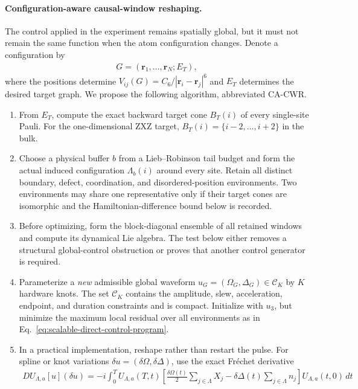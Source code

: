 \paragraph{Configuration-aware causal-window reshaping.}
The control applied in the experiment remains spatially global, but it must
not remain the same function when the atom configuration changes.  Denote a
configuration by
\begin{align}
G=(\boldsymbol r_1,\ldots,\boldsymbol r_N;E_T),
\end{align}
where the positions determine
$V_{ij}(G)=C_6/|\boldsymbol r_i-\boldsymbol r_j|^6$ and $E_T$ determines the
desired target graph.  We propose the following algorithm, abbreviated
CA-CWR.
\begin{enumerate}
\item From $E_T$, compute the exact backward target cone
$B_T(i)$ of every single-site Pauli.  For the one-dimensional ZXZ target,
$B_T(i)=\{i-2,\ldots,i+2\}$ in the bulk.
\item Choose a physical buffer $b$ from a Lieb--Robinson tail budget and form
the actual induced configuration $\Lambda_b(i)$ around every site.  Retain
all distinct boundary, defect, coordination, and disordered-position
environments.  Two environments may share one representative only if their
target cones are isomorphic and the Hamiltonian-difference bound below is
recorded.
\item Before optimizing, form the block-diagonal ensemble of all retained
windows and compute its dynamical Lie algebra.  The test below either removes
a structural global-control obstruction or proves that another control
generator is required.
\item Parameterize a \emph{new} admissible global waveform
$u_G=(\Omega_G,\Delta_G)\in\mathcal C_K$ by $K$ hardware knots.  The set
$\mathcal C_K$ contains the amplitude, slew, acceleration, endpoint, and
duration constraints and is compact.  Initialize with $u_3$, but minimize the
maximum local residual over all environments as in
Eq.~\eqref{eq:scalable-direct-control-program}.
\item In a practical implementation, reshape rather than restart the pulse.
For spline or knot variations $\delta u=(\delta\Omega,\delta\Delta)$, use the
exact Fr\'echet derivative
\begin{align}
D U_{\Lambda,a}[u](\delta u)
=-i\int_0^T U_{\Lambda,a}(T,t)
\left[
\frac{\delta\Omega(t)}{2}\sum_{j\in\Lambda}X_j
-\delta\Delta(t)\sum_{j\in\Lambda}n_j
\right]
U_{\Lambda,a}(t,0)\,dt
\label{eq:configuration-waveform-frechet}

\end{align}
\end{enumerate}
